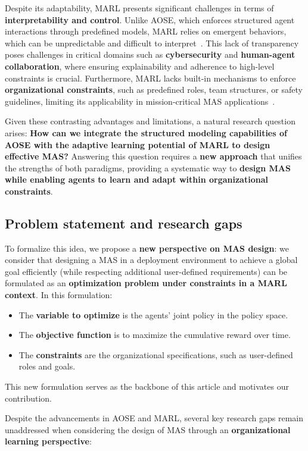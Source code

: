 \documentclass[pdflatex,sn-mathphys-num]{sn-jnl}%
\theoremstyle{thmstyleone}%
\theoremstyle{thmstyletwo}%
\theoremstyle{thmstylethree}%
\begin{document}
Despite its adaptability, MARL presents significant challenges in terms of \textbf{interpretability and control}. Unlike AOSE, which enforces structured agent interactions through predefined models, MARL relies on emergent behaviors, which can be unpredictable and difficult to interpret~\cite{Du2022}. This lack of transparency poses challenges in critical domains such as \textbf{cybersecurity} and \textbf{human-agent collaboration}, where ensuring explainability and adherence to high-level constraints is crucial. Furthermore, MARL lacks built-in mechanisms to enforce \textbf{organizational constraints}, such as predefined roles, team structures, or safety guidelines, limiting its applicability in mission-critical MAS applications~\cite{Nguyen2020}.

Given these contrasting advantages and limitations, a natural research question arises: \textbf{How can we integrate the structured modeling capabilities of AOSE with the adaptive learning potential of MARL to design effective MAS?} Answering this question requires a \textbf{new approach} that unifies the strengths of both paradigms, providing a systematic way to \textbf{design MAS while enabling agents to learn and adapt within organizational constraints}.

\subsection{Problem statement and research gaps}

To formalize this idea, we propose a \textbf{new perspective on MAS design}: we consider that designing a MAS in a deployment environment to achieve a global goal efficiently (while respecting additional user-defined requirements) can be formulated as an \textbf{optimization problem under constraints in a MARL context}. In this formulation:
\begin{itemize}
    \item The \textbf{variable to optimize} is the agents' joint policy in the policy space.
    \item The \textbf{objective function} is to maximize the cumulative reward over time.
    \item The \textbf{constraints} are the organizational specifications, such as user-defined roles and goals.
\end{itemize}
This new formulation serves as the backbone of this article and motivates our contribution.

Despite the advancements in AOSE and MARL, several key research gaps remain unaddressed when considering the design of MAS through an \textbf{organizational learning perspective}:
\end{document}
